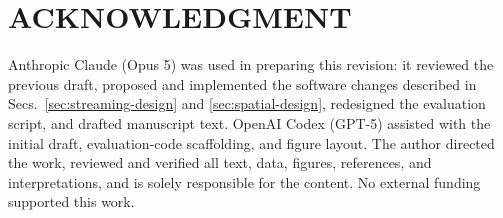 \documentclass[final]{jaes}
\begin{document}
\section*{ACKNOWLEDGMENT}

Anthropic Claude (Opus 5) was used in preparing this revision: it reviewed the previous draft, proposed and implemented the software changes described in Secs.~\ref{sec:streaming-design} and \ref{sec:spatial-design}, redesigned the evaluation script, and drafted manuscript text. OpenAI Codex (GPT-5) assisted with the initial draft, evaluation-code scaffolding, and figure layout. The author directed the work, reviewed and verified all text, data, figures, references, and interpretations, and is solely responsible for the content. No external funding supported this work.




\end{document}
